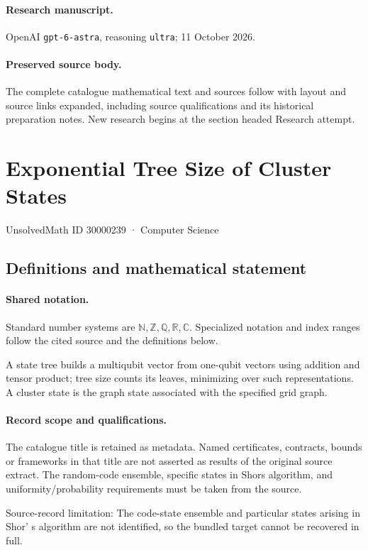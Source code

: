 \documentclass[11pt]{article}
\begin{document}
\paragraph{Research manuscript.} OpenAI \texttt{gpt-6-astra}, reasoning \texttt{ultra}; 11 October 2026.
\paragraph{Preserved source body.} The complete catalogue mathematical text and sources follow with layout and source links expanded, including source qualifications and its historical preparation notes. New research begins at the section headed Research attempt.

\section{Exponential Tree Size of Cluster States}\label{30000239}
{\small UnsolvedMath ID 30000239 · Computer Science}
\subsection{Definitions and mathematical statement}

\paragraph{Shared notation.}Standard number systems are $\mathbb N,\mathbb Z,\mathbb Q,\mathbb R,\mathbb C$. Specialized notation and index ranges follow the cited source and the definitions below.


A state tree builds a multiqubit vector from one-qubit vectors using addition and tensor product; tree size counts its leaves, minimizing over such representations. A cluster state is the graph state associated with the specified grid graph.
\paragraph{Record scope and qualifications.}
The catalogue title is retained as metadata. Named certificates, contracts, bounds or frameworks in that title are not asserted as results of the original source extract.
The random-code ensemble, specific states in Shor\textquotesingle s algorithm, and uniformity/probability requirements must be taken from the source.

Source-record limitation: The code-state ensemble and particular states arising in Shor' s algorithm are not identified, so the bundled target cannot be recovered in full.
\end{document}
